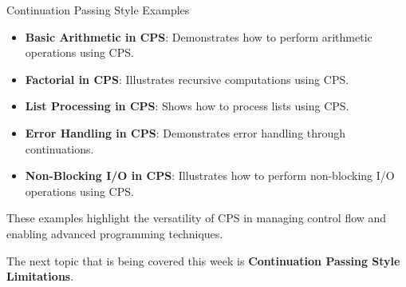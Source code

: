 \begin{notes}{Continuation Passing Style Examples}
\begin{highlight}
        \begin{itemize}
            \item \textbf{Basic Arithmetic in CPS}: Demonstrates how to perform arithmetic operations using CPS.
            \item \textbf{Factorial in CPS}: Illustrates recursive computations using CPS.
            \item \textbf{List Processing in CPS}: Shows how to process lists using CPS.
            \item \textbf{Error Handling in CPS}: Demonstrates error handling through continuations.
            \item \textbf{Non-Blocking I/O in CPS}: Illustrates how to perform non-blocking I/O operations using CPS.
        \end{itemize}
    
        These examples highlight the versatility of CPS in managing control flow and enabling advanced programming techniques.
    
    \end{highlight}
\end{notes}

The next topic that is being covered this week is \textbf{Continuation Passing Style Limitations}.

